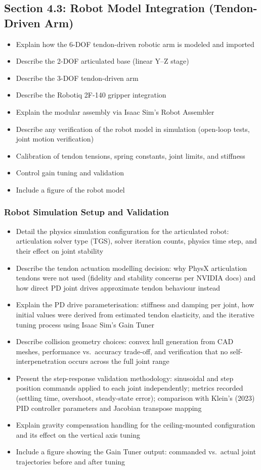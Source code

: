 \subsection{Section 4.3: Robot Model Integration (Tendon-Driven Arm)}
\begin{itemize}
    \item Explain how the 6-DOF tendon-driven robotic arm is modeled and imported
    \item Describe the 2-DOF articulated base (linear Y--Z stage)
    \item Describe the 3-DOF tendon-driven arm
    \item Describe the Robotiq 2F-140 gripper integration
    \item Explain the modular assembly via Isaac Sim's Robot Assembler
    \item Describe any verification of the robot model in simulation (open-loop tests, joint motion verification)
    \item Calibration of tendon tensions, spring constants, joint limits, and stiffness
    \item Control gain tuning and validation
    \item Include a figure of the robot model
\end{itemize}

\subsubsection{Robot Simulation Setup and Validation}
\begin{itemize}
    \item Detail the physics simulation configuration for the articulated robot: articulation solver type (TGS), solver iteration counts, physics time step, and their effect on joint stability
    \item Describe the tendon actuation modelling decision: why PhysX articulation tendons were not used (fidelity and stability concerns per NVIDIA docs) and how direct PD joint drives approximate tendon behaviour instead
    \item Explain the PD drive parameterisation: stiffness and damping per joint, how initial values were derived from estimated tendon elasticity, and the iterative tuning process using Isaac Sim's Gain Tuner
    \item Describe collision geometry choices: convex hull generation from CAD meshes, performance vs.\ accuracy trade-off, and verification that no self-interpenetration occurs across the full joint range
    \item Present the step-response validation methodology: sinusoidal and step position commands applied to each joint independently; metrics recorded (settling time, overshoot, steady-state error); comparison with Klein's (2023) PID controller parameters and Jacobian transpose mapping
    \item Explain gravity compensation handling for the ceiling-mounted configuration and its effect on the vertical axis tuning
    \item Include a figure showing the Gain Tuner output: commanded vs.\ actual joint trajectories before and after tuning
\end{itemize}

